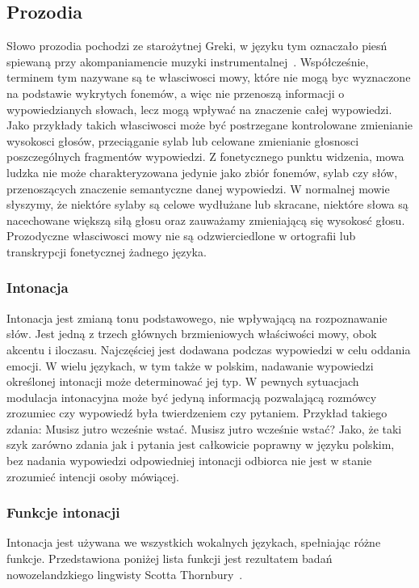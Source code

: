 \documentclass[a4paper,12 pt]{article}
\begin{document}
\subsection{Prozodia}
Słowo prozodia pochodzi ze starożytnej Greki, w języku tym oznaczało piesń spiewaną przy akompaniamencie muzyki instrumentalnej~\cite{pros}. Współcześnie, terminem tym nazywane są te własciwosci mowy, które nie mogą byc wyznaczone na podstawie wykrytych fonemów, a więc nie przenoszą informacji o wypowiedzianych słowach, lecz mogą wpływać na znaczenie całej wypowiedzi. Jako przykłady takich własciwosci może być postrzegane kontrolowane zmienianie wysokosci głosów, przeciąganie sylab lub celowane zmienianie głosnosci poszczególnych fragmentów wypowiedzi.
Z fonetycznego punktu widzenia, mowa ludzka nie może charakteryzowana jedynie jako zbiór fonemów, sylab czy słów, przenoszących znaczenie semantyczne danej wypowiedzi. W normalnej mowie słyszymy, że niektóre sylaby są celowe wydłużane lub skracane, niektóre słowa są nacechowane większą siłą głosu oraz zauważamy zmieniającą się wysokosć głosu.
Prozodyczne własciwosci mowy nie są odzwierciedlone w ortografii lub transkrypcji fonetycznej żadnego języka.
\subsubsection{Intonacja}
Intonacja jest zmianą tonu podstawowego, nie wpływającą na rozpoznawanie słów. Jest jedną z trzech głównych brzmieniowych właściwości mowy, obok akcentu i iloczasu. Najczęściej jest dodawana podczas wypowiedzi w celu oddania emocji. W wielu językach, w tym także w polskim, nadawanie wypowiedzi określonej intonacji może determinować jej typ. W pewnych sytuacjach modulacja intonacyjna może być jedyną informacją pozwalającą rozmówcy zrozumiec czy wypowiedź była twierdzeniem czy pytaniem. 
Przykład takiego zdania:
\newline Musisz jutro wcześnie wstać.
\newline Musisz jutro wcześnie wstać?
\newline Jako, że taki szyk zarówno zdania jak i pytania jest całkowicie poprawny w języku polskim, bez nadania wypowiedzi odpowiedniej intonacji odbiorca nie jest w stanie zrozumieć intencji osoby mówiącej.
\subsubsection{Funkcje intonacji}
Intonacja jest używana we wszystkich wokalnych językach, spełniając różne funkcje. 
Przedstawiona poniżej lista funkcji jest rezultatem badań nowozelandzkiego lingwisty Scotta Thornbury~\cite{TS}.
\end{document}
